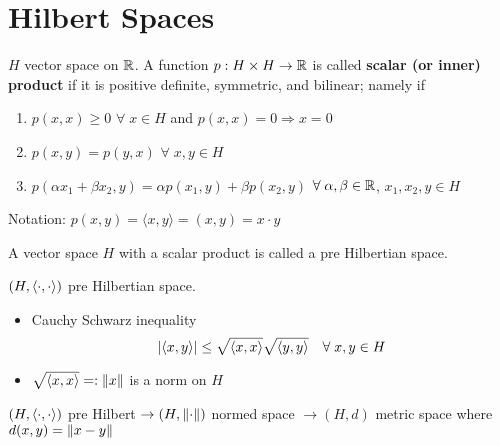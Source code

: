 \newpage
\section{Hilbert Spaces}

\begin{definition}
    \(H\) vector space on \(\mathbb{R}\). A function \(p:H \times H \to \mathbb{R}\) is called \textbf{scalar (or inner) product} if it is positive definite, symmetric, and bilinear; namely if 
    \begin{enumerate}
        \item \(p(x, x) \geq 0\) \(\forall \; x \in H\) and \(p(x, x) = 0 \Rightarrow x=0\)
        \item \(p(x, y) = p(y, x)\) \(\forall \; x, y \in H\)
        \item \(p(\alpha x_1 + \beta x_2, y) = \alpha p (x_1, y) + \beta p(x_2, y)\) \(\forall \; \alpha, \beta \in \mathbb{R}\), \(x_1, x_2, y \in H\)
    \end{enumerate}
\end{definition}

Notation: \(p(x, y) = \langle x, y \rangle = (x, y) = x \cdot y\)

\begin{definition}
    A vector space \(H\) with a scalar product is called a pre Hilbertian space.
\end{definition}

\begin{proposition}
    \((H, \langle \cdot,\cdot \rangle )\) pre Hilbertian space.
    \begin{itemize}
        \item Cauchy Schwarz inequality \[
            \abs{\langle x, y\rangle} \leq \sqrt{\langle x, x\rangle} \sqrt{\langle y, y\rangle } \quad \forall \; x, y \in H
        \]
        \item \(\sqrt{\langle x, x \rangle} =: \norm{x}\) is a norm on \(H\)
    \end{itemize}
\end{proposition}

\((H, \langle \cdot,\cdot \rangle)\) pre Hilbert \(\to (H, \norm{\cdot})\) normed space \(\to (H, d)\) metric space where \(d(x, y) = \norm{x-y}\)
